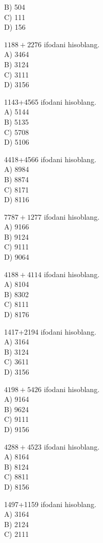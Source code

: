 B) 504\\
C) 111\\
D) 156
  \item $1188+2276$ ifodani hisoblang.\\
A) 3464\\
B) 3124\\
C) 3111\\
D) 3156
  \item 1143+4565 ifodani hisoblang.\\
A) 5144\\
B) 5135\\
C) 5708\\
D) 5106
  \item 4418+4566 ifodani hisoblang.\\
A) 8984\\
B) 8874\\
C) 8171\\
D) 8116
  \item $7787+1277$ ifodani hisoblang.\\
A) 9166\\
B) 9124\\
C) 9111\\
D) 9064
  \item $4188+4114$ ifodani hisoblang.\\
A) 8104\\
B) 8302\\
C) 8111\\
D) 8176
  \item 1417+2194 ifodani hisoblang.\\
A) 3164\\
B) 3124\\
C) 3611\\
D) 3156
  \item $4198+5426$ ifodani hisoblang.\\
A) 9164\\
B) 9624\\
C) 9111\\
D) 9156
  \item $4288+4523$ ifodani hisoblang.\\
A) 8164\\
B) 8124\\
C) 8811\\
D) 8156
  \item 1497+1159 ifodani hisoblang.\\
A) 3164\\
B) 2124\\
C) 2111\\
